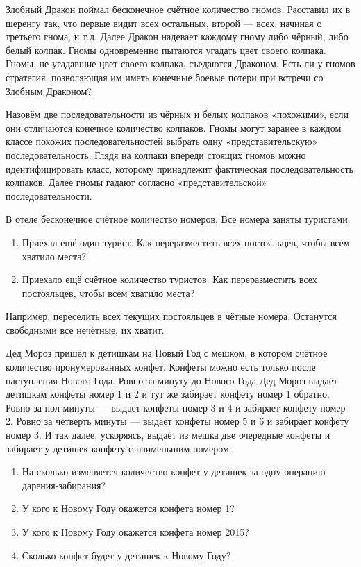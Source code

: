 \begin{problem}
Злобный Дракон поймал бесконечное счётное количество гномов. Расставил их в шеренгу так, что первые видит всех остальных, второй --- всех, начиная с третьего гнома, и т.д. Далее Дракон надевает каждому гному либо чёрный, либо белый колпак. Гномы одновременно пытаются угадать цвет своего колпака. Гномы, не угадавшие цвет своего колпака, съедаются Драконом. Есть ли у гномов стратегия, позволяющая им иметь конечные боевые потери при встречи со Злобным Драконом?
\end{problem}
\begin{solution}
Назовём две последовательности из чёрных и белых колпаков «похожими», если они отличаются конечное количество колпаков. Гномы могут заранее в каждом классе похожих последовательностей выбрать одну «представительскую» последовательность. Глядя на колпаки впереди стоящих гномов можно идентифицировать класс, которому принадлежит фактическая последовательность колпаков. Далее гномы гадают согласно «представительской» последовательности.
\end{solution}


\begin{problem}
В отеле бесконечное счётное количество номеров. Все номера заняты туристами. 
\begin{enumerate}
\item Приехал ещё один турист. Как переразместить всех постояльцев, чтобы всем хватило места?
\item Приехало ещё счётное количество туристов. Как переразместить всех постояльцев, чтобы всем хватило места?
\end{enumerate}
\end{problem}
\begin{solution}
Например, переселить всех текущих постояльцев в чётные номера. Останутся свободными все нечётные, их хватит.
\end{solution}


\begin{problem}
Дед Мороз пришёл к детишкам на Новый Год с мешком, в котором счётное количество пронумерованных конфет. Конфеты можно есть только после наступления Нового Года. Ровно за минуту до Нового Года Дед Мороз выдаёт детишкам конфеты номер 1 и 2 и тут же забирает конфету номер 1 обратно. Ровно за пол-минуты --- выдаёт конфеты номер 3 и 4 и забирает конфету номер 2. Ровно за четверть минуты --- выдаёт конфеты номер 5 и 6 и забирает конфету номер 3. И так далее, ускоряясь, выдаёт из мешка две очередные конфеты и забирает у детишек конфету с наименьшим номером.

\begin{enumerate}
\item На сколько изменяется количество конфет у детишек за одну операцию дарения-забирания?
\item У кого к Новому Году окажется конфета номер 1?
\item У кого к Новому Году окажется конфета номер 2015?
\item Сколько конфет будет у детишек к Новому Году? 
\end{enumerate}
\end{problem}

